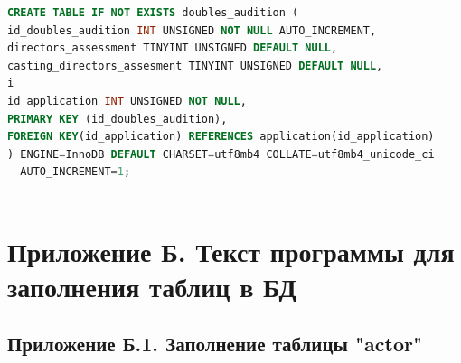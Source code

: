 \documentclass[11pt,a4paper,final]{article} %
\begin{document}
\begin{lstlisting}[language=SQL]
CREATE TABLE IF NOT EXISTS doubles_audition (
id_doubles_audition INT UNSIGNED NOT NULL AUTO_INCREMENT,
directors_assessment TINYINT UNSIGNED DEFAULT NULL, 
casting_directors_assesment TINYINT UNSIGNED DEFAULT NULL,
i  
id_application INT UNSIGNED NOT NULL,
PRIMARY KEY (id_doubles_audition),
FOREIGN KEY(id_application) REFERENCES application(id_application)
) ENGINE=InnoDB DEFAULT CHARSET=utf8mb4 COLLATE=utf8mb4_unicode_ci 
  AUTO_INCREMENT=1;	
	
\end{lstlisting}	


\section*{Приложение Б. Текст программы для заполнения таблиц в БД}
\label{sec:appendixB}

\subsection*{Приложение Б.1. Заполнение таблицы "actor"}	
\end{document}
